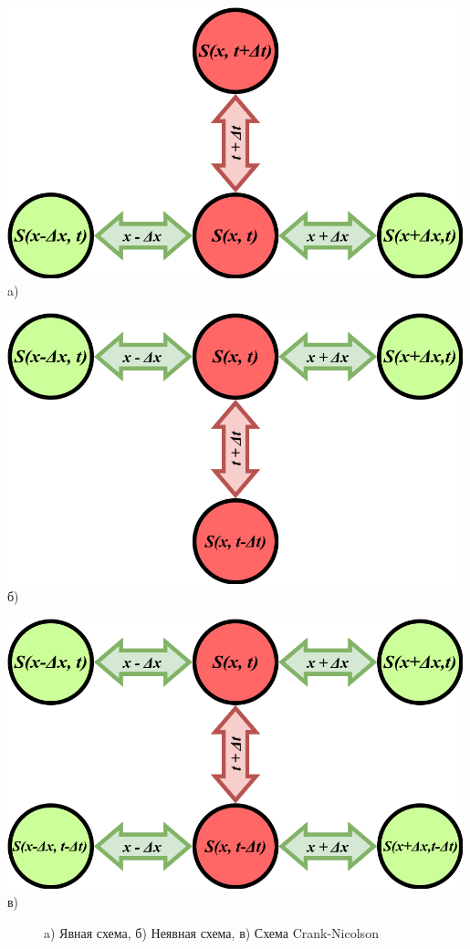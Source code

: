 \noindent
\begin{minipage}[b]{0.3\textwidth}
	\centering
    \includegraphics[width=0.99\textwidth]{assets/FTCS}\\
    a)
\end{minipage}
\hfill
\begin{minipage}[b]{0.3\textwidth}
	\centering
	\includegraphics[width=0.99\textwidth]{assets/BTCS}\\
	б)
\end{minipage}
\hfill
\begin{minipage}[b]{0.3\textwidth}
	\centering
	\includegraphics[width=0.99\textwidth]{assets/CN}\\
	в)
\end{minipage}
\begin{figure}[h!]
	\centering
	\caption{a) Явная схема, б) Неявная схема, в) Схема Crank-Nicolson}
	\label{fig:FDShms}
\end{figure}

